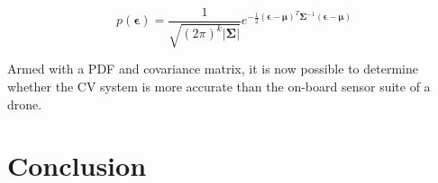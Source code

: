 \begin{equation}
  \label{eq:pdf}
  p(\bm{\epsilon}) = \frac{1}{\sqrt{{(2\pi)}^k\lvert\bm{\Sigma}\rvert}}e^{-\frac{1}{2}{(\bm{\epsilon} - \bm{\mu})}^T\bm{\Sigma}^{-1}(\bm{\epsilon} - \bm{\mu})}
\end{equation}

Armed with a PDF and covariance matrix, it is now possible to determine whether the CV system is more accurate than the on-board sensor suite of a drone. 

\section{Conclusion}

